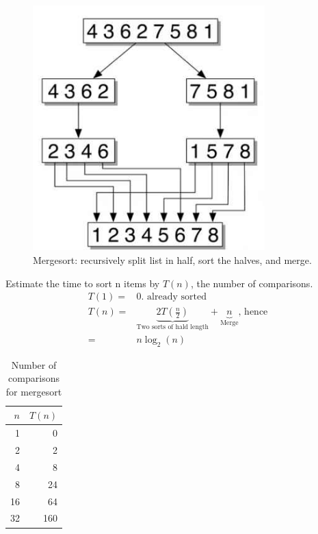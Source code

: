 \documentclass[]{article}
\begin{document}
\begin{figure}[H]
	\caption{Mergesort: recursively split list in half, sort the halves, and merge.}\label{fig:mergesort}
	\includegraphics[width=0.8\textwidth]{mergesort}
\end{figure}

Estimate the time to sort n items by $T(n)$, the number of comparisons.
\begin{align*}
T(1) =& 0 \text{. already sorted}\\
T(n) =&\underbrace{ 2T(\frac{n}{2})}_\text{Two sorts of hald length} + \underbrace{n}_\text{Merge} \text{, hence}\\
=& n \log_2(n)
\end{align*}

\begin{table}[H]
	\begin{center}
		\caption{Number of comparisons for mergesort}
		\begin{tabular}{|r|r|} \hline
			$n$&$T(n)$  \\ \hline
			1& 0\\ \hline
			2&2 \\ \hline
			4&8 \\ \hline
			8& 24\\ \hline
			16& 64\\ \hline
			32& 160\\ \hline
		\end{tabular}
	\end{center}
\end{table}
\end{document}
